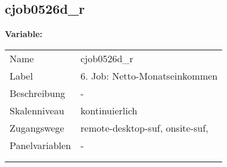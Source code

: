 	
	
	\subsection{cjob0526d\_r}
	\label{subSection:cjob0526d_r}

	\noindent\textbf{Variable:}\\
		\begin{tabular}{lL{11.3cm}}
			\label{tableVariable:cjob0526d_r}
			Name & cjob0526d\_r \\
			Label & 6. Job: Netto-Monatseinkommen \\
			Beschreibung & - \\
			Skalenniveau & kontinuierlich \\
			Zugangswege &
				remote-desktop-suf,
				onsite-suf,
 \\
			Panelvariablen & -
			 \\
			 \\
 \\
		\end{tabular}





